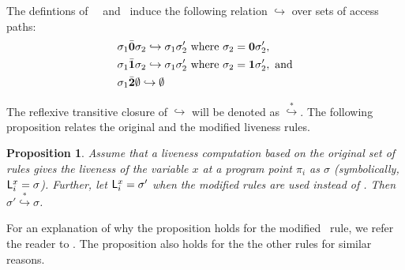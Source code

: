 \documentclass[9pt]{sigplanconf}
\newtheorem{proposition}[theorem]{Proposition}
\begin{document}
The  defintions of \bcar\, \bcdr\ and \cbar\  induce   the  following
relation $\hookrightarrow$ over sets of access paths:
\begin{align*}
  &\sigma_1\bar{\mathbf{0}}\sigma_2  \hookrightarrow 
  \sigma_1\sigma_2'\mbox{ where } \sigma_2 = \mathbf{0}\sigma_2',\\
&\sigma_1\bar{\mathbf{1}}\sigma_2  \hookrightarrow 
  \sigma_1\sigma_2'\mbox{ where } \sigma_2 =
  \mathbf{1}\sigma_2',~\mbox{and}\\  
&\sigma_1\bar{\mathbf{2}} \emptyset \hookrightarrow \emptyset
\end{align*}


The reflexive  transitive closure of  $\hookrightarrow$ will
be   denoted    as   $\stackrel{*}{\hookrightarrow}$.    The
following proposition relates  the original and the modified
liveness rules.



\begin{proposition}
Assume that a liveness computation  based on the original set of rules
gives the liveness  of the variable $x$ at a  program point $\pi_i$ as
$\sigma$   (symbolically,   $\mathsf{L}_{{i}}^{x}=   \sigma$).   Further,   let
$\mathsf{L}_{{i}}^{x}=  \sigma'$ when the  modified rules  are used  instead of
\Lfunonly.  Then $\sigma' \stackrel{*}{\hookrightarrow} \sigma$.
\end{proposition}

For  an explanation  of why  the  proposition holds  for the  modified
\CONS\  rule,   we  refer   the  reader  to   \cite{asati14lgc}.   The
proposition also holds for the the other rules for similar reasons.



 
\end{document}
